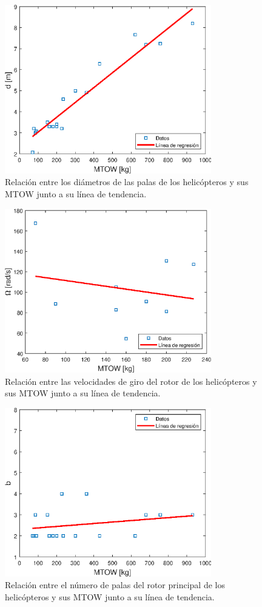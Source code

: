 \begin{figure}
	\centering
	\includegraphics[width=90mm]{graficos/anald}
	\caption{Relación entre los diámetros de las palas de los helicópteros y sus MTOW junto a su línea de tendencia.}
	\label{diamAS}
\end{figure}
\begin{figure}
	\centering
	\includegraphics[width=90mm]{graficos/analomega}
	\caption{Relación entre las velocidades de giro del rotor de los helicópteros y sus MTOW junto a su línea de tendencia.}
	\label{omegaAS}
\end{figure}
\begin{figure}
	\centering
	\includegraphics[width=90mm]{graficos/analb}
	\caption{Relación entre el número de palas del rotor principal de los helicópteros y sus MTOW junto a su línea de tendencia.}
	\label{bAS}
\end{figure}
